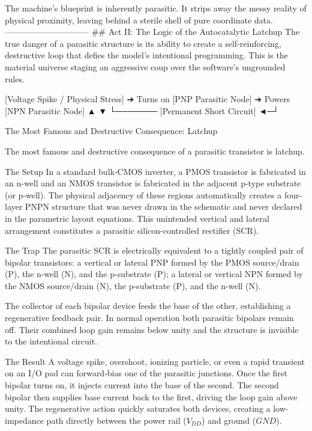 The machine's blueprint is inherently parasitic. It strips away the messy reality of physical proximity, leaving behind a sterile shell of pure coordinate data.
------------------------------
## Act II: The Logic of the Autocatalytic Latchup
The true danger of a parasitic structure is its ability to create a self-reinforcing, destructive loop that defies the model's intentional programming. This is the material universe staging an aggressive coup over the software's ungrounded rules.

[Voltage Spike / Physical Stress] ➔ Turns on [PNP Parasitic Node] ➔ Powers [NPN Parasitic Node]
                                             ▲                                    ▼
                                             └─────── [Permanent Short Circuit] ◄─┘


The Most Famous and Destructive Consequence: Latchup

The most famous and destructive consequence of a parasitic transistor is latchup.

The Setup  
In a standard bulk-CMOS inverter, a PMOS transistor is fabricated in an n-well and an NMOS transistor is fabricated in the adjacent p-type substrate (or p-well). The physical adjacency of these regions automatically creates a four-layer PNPN structure that was never drawn in the schematic and never declared in the parametric layout equations. This unintended vertical and lateral arrangement constitutes a parasitic silicon-controlled rectifier (SCR).

The Trap  
The parasitic SCR is electrically equivalent to a tightly coupled pair of bipolar transistors:  
a vertical or lateral PNP formed by the PMOS source/drain (P), the n-well (N), and the p-substrate (P);  
a lateral or vertical NPN formed by the NMOS source/drain (N), the p-substrate (P), and the n-well (N).  

The collector of each bipolar device feeds the base of the other, establishing a regenerative feedback pair. In normal operation both parasitic bipolars remain off. Their combined loop gain remains below unity and the structure is invisible to the intentional circuit.

The Result  
A voltage spike, overshoot, ionizing particle, or even a rapid transient on an I/O pad can forward-bias one of the parasitic junctions. Once the first bipolar turns on, it injects current into the base of the second. The second bipolar then supplies base current back to the first, driving the loop gain above unity. The regenerative action quickly saturates both devices, creating a low-impedance path directly between the power rail (\(V_{DD}\)) and ground (\(GND\)).  

